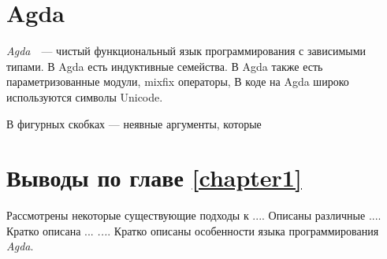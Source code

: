\section{Agda}
\textit{Agda}~\cite{AgdaLang}~---  чистый функциональный язык программирования с зависимыми типами.
В Agda есть индуктивные семейства.
В Agda также есть параметризованные модули, mixfix операторы,
В коде на Agda широко используются символы Unicode.

В фигурных скобках — неявные аргументы, которые 


\section{Выводы по главе \ref{chapter1}}
Рассмотрены некоторые существующие подходы к ....
Описаны различные ....
Кратко описана ... \textit{...}.
Кратко описаны особенности языка программирования \textit{Agda}.


